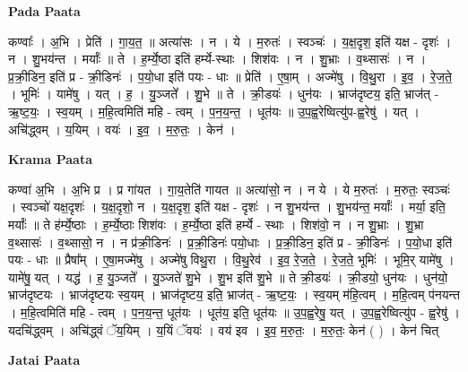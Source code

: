 \documentclass[17pt]{extarticle}
\begin{document}
\textbf{Pada Paata} \newline

कण्वाः᳚ । अ॒भि । प्रेति॑ । गा॒य॒त॒ ॥ अत्या॑सः । न । ये । म॒रुतः॑ । स्वञ्चः॑ । य॒क्ष॒दृश॒ इति॑ यक्ष - दृशः॑ । न । शु॒भय॑न्त । मर्याः᳚ ॥ ते । ह॒र्म्ये॒ष्ठा इति॑ हर्म्ये-स्थाः । शिश॑वः । न । शु॒भ्राः । व॒थ्सासः॑ । न । प्र॒क्री॒डिन॒ इति॑ प्र - क्री॒डिनः॑ । प॒यो॒धा इति॑ पयः - धाः ॥ प्रेति॑ । ए॒षा॒म् । अज्मे॑षु । वि॒थु॒रा । इ॒व॒ । रे॒ज॒ते॒ । भूमिः॑ । यामे॑षु । यत् । ह॒ । यु॒ञ्जते᳚ । शु॒भे ॥ ते । क्री॒डयः॑ । धुन॑यः । भ्राज॑दृष्टय॒ इति॒ भ्राज॑त् - ऋ॒ष्ट॒यः॒ । स्व॒यम् । म॒हि॒त्वमिति॑ महि - त्वम् । प॒न॒य॒न्त॒ । धूत॑यः ॥ उ॒प॒ह्व॒रेष्वित्यु॑प-ह्व॒रेषु॑ । यत् । अचि॑द्ध्वम् । य॒यिम् । वयः॑ । इ॒व॒ । म॒रु॒तः॒ । केन॑ ।  \newline


\textbf{Krama Paata} \newline

कण्वा॑ अ॒भि । अ॒भि प्र । प्र गा॑यत । गा॒य॒तेति॑ गायत ॥ अत्या॑सो॒ न । न ये । ये म॒रुतः॑ । म॒रुतः॒ स्वञ्चः॑ । स्वञ्चो॑ यक्ष॒दृशः॑ । य॒क्ष॒दृशो॒ न । य॒क्ष॒दृश॒ इति॑ यक्ष - दृशः॑ । न शु॒भय॑न्त । शु॒भय॑न्त॒ मर्याः᳚ । मर्या॒ इति॒ मर्याः᳚ ॥ ते ह॑र्म्ये॒ष्ठाः । ह॒र्म्ये॒ष्ठाः शिश॑वः । ह॒र्म्ये॒ष्ठा इति॑ हर्म्ये - स्थाः । शिश॑वो॒ न । न शु॒भ्राः । शु॒भ्रा व॒थ्सासः॑ । व॒थ्सासो॒ न । न प्र॑क्री॒डिनः॑ । प्र॒क्री॒डिनः॑ पयो॒धाः । प्र॒क्री॒डिन॒ इति॑ प्र - क्री॒डिनः॑ । प॒यो॒धा इति॑ पयः - धाः ॥ प्रैषा᳚म् । ए॒षा॒मज्मे॑षु । अज्मे॑षु विथु॒रा । वि॒थु॒रेव॑ । इ॒व॒ रे॒ज॒ते॒ । रे॒ज॒ते॒ भूमिः॑ । भूमि॒र् यामे॑षु । यामे॑षु॒ यत् । यद्ध॑ । ह॒ यु॒ञ्जते᳚ । यु॒ञ्जते॑ शु॒भे । शु॒भ इति॑ शु॒भे ॥ ते क्री॒डयः॑ । क्री॒डयो॒ धुन॑यः । धुन॑यो॒ भ्राज॑दृष्टयः । भ्राज॑दृष्टयः स्व॒यम् । भ्राज॑दृष्टय॒ इति॒ भ्राज॑त् - ऋ॒ष्ट॒यः॒ । स्व॒यम् म॑हि॒त्वम् । म॒हि॒त्वम् प॑नयन्त । म॒हि॒त्वमिति॑ महि - त्वम् । प॒न॒य॒न्त॒ धूत॑यः । धूत॑य॒ इति॒ धूत॑यः ॥ उ॒प॒ह्व॒रेषु॒ यत् । उ॒प॒ह्व॒रेष्वित्यु॑प - ह्व॒रेषु॑ । यदचि॑द्ध्वम् । अचि॑द्ध्वं ॅय॒यिम् । य॒यिं ॅवयः॑ । वय॑ इव । इ॒व॒ म॒रु॒तः॒ । म॒रु॒तः॒ केन॑ ( ) । केन॑ चित् \newline

\textbf{Jatai Paata} \newline
\end{document}
